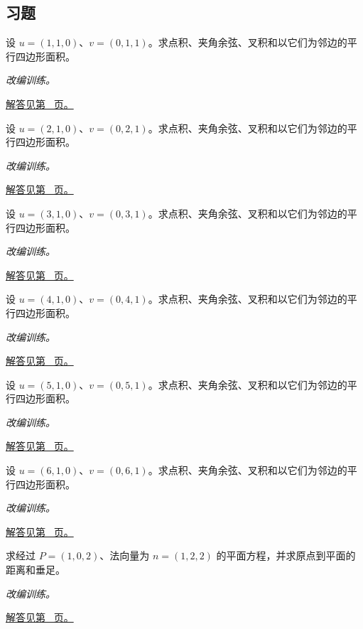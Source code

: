 \documentclass[UTF8,12pt,a4paper,fontset=fandol]{ctexart}
\begin{document}
\subsection{习题}
\begin{example}[点积、叉积与平行四边形]\label{ex:c31q1}
设 $u=(1,1,0)$、$v=(0,1,1)$。求点积、夹角余弦、叉积和以它们为邻边的平行四边形面积。
\par\textit{改编训练。}\par\hyperref[ans:c31q1]{解答见第~\pageref{ans:c31q1} 页。}
\end{example}
\begin{example}[点积、叉积与平行四边形]\label{ex:c31q2}
设 $u=(2,1,0)$、$v=(0,2,1)$。求点积、夹角余弦、叉积和以它们为邻边的平行四边形面积。
\par\textit{改编训练。}\par\hyperref[ans:c31q2]{解答见第~\pageref{ans:c31q2} 页。}
\end{example}
\begin{example}[点积、叉积与平行四边形]\label{ex:c31q3}
设 $u=(3,1,0)$、$v=(0,3,1)$。求点积、夹角余弦、叉积和以它们为邻边的平行四边形面积。
\par\textit{改编训练。}\par\hyperref[ans:c31q3]{解答见第~\pageref{ans:c31q3} 页。}
\end{example}
\begin{example}[点积、叉积与平行四边形]\label{ex:c31q4}
设 $u=(4,1,0)$、$v=(0,4,1)$。求点积、夹角余弦、叉积和以它们为邻边的平行四边形面积。
\par\textit{改编训练。}\par\hyperref[ans:c31q4]{解答见第~\pageref{ans:c31q4} 页。}
\end{example}
\begin{example}[点积、叉积与平行四边形]\label{ex:c31q5}
设 $u=(5,1,0)$、$v=(0,5,1)$。求点积、夹角余弦、叉积和以它们为邻边的平行四边形面积。
\par\textit{改编训练。}\par\hyperref[ans:c31q5]{解答见第~\pageref{ans:c31q5} 页。}
\end{example}
\begin{example}[点积、叉积与平行四边形]\label{ex:c31q6}
设 $u=(6,1,0)$、$v=(0,6,1)$。求点积、夹角余弦、叉积和以它们为邻边的平行四边形面积。
\par\textit{改编训练。}\par\hyperref[ans:c31q6]{解答见第~\pageref{ans:c31q6} 页。}
\end{example}
\begin{example}[平面方程与点面距离]\label{ex:c31q7}
求经过 $P=(1,0,2)$、法向量为 $n=(1,2,2)$ 的平面方程，并求原点到平面的距离和垂足。
\par\textit{改编训练。}\par\hyperref[ans:c31q7]{解答见第~\pageref{ans:c31q7} 页。}
\end{example}
\end{document}
